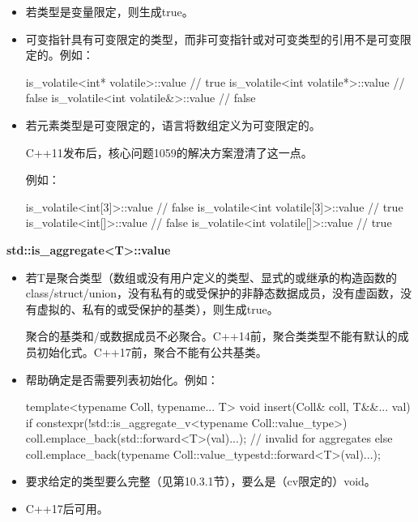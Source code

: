 \begin{itemize}
\item 
若类型是变量限定，则生成true。

\item 
可变指针具有可变限定的类型，而非可变指针或对可变类型的引用不是可变限定的。例如：

\begin{cpp}
is_volatile<int* volatile>::value // true
is_volatile<int volatile*>::value // false
is_volatile<int volatile&>::value // false
\end{cpp}

\item 
若元素类型是可变限定的，语言将数组定义为可变限定的。

\begin{notice}
C++11发布后，核心问题1059的解决方案澄清了这一点。
\end{notice}

例如：
\begin{cpp}
is_volatile<int[3]>::value // false
is_volatile<int volatile[3]>::value // true
is_volatile<int[]>::value // false
is_volatile<int volatile[]>::value // true
\end{cpp}
\end{itemize}

\textbf{std::is\_aggregate<T>::value}

\begin{itemize}
\item 
若T是聚合类型（数组或没有用户定义的类型、显式的或继承的构造函数的class/struct/union，没有私有的或受保护的非静态数据成员，没有虚函数，没有虚拟的、私有的或受保护的基类），则生成true。

\begin{notice}
聚合的基类和/或数据成员不必聚合。C++14前，聚合类类型不能有默认的成员初始化式。C++17前，聚合不能有公共基类。
\end{notice}

\item 
帮助确定是否需要列表初始化。例如：
\begin{cpp}
template<typename Coll, typename... T>
void insert(Coll& coll, T&&... val)
{
	if constexpr(!std::is_aggregate_v<typename Coll::value_type>) {
		coll.emplace_back(std::forward<T>(val)...); // invalid for aggregates
	}
	else {
		coll.emplace_back(typename Coll::value_type{std::forward<T>(val)...});
	}
}
\end{cpp}

\item 
要求给定的类型要么完整（见第10.3.1节），要么是（cv限定的）void。

\item 
C++17后可用。
\end{itemize}

